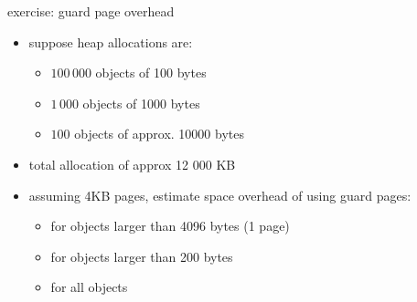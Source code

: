 \begin{frame}{exercise: guard page overhead}
    \begin{itemize}
    \item suppose heap allocations are:
        \begin{itemize}
        \item $100\,000$ objects of 100 bytes
        \item $1\,000$ objects of 1000 bytes
        \item $100$ objects of approx. 10000 bytes
        \end{itemize}
    \item total allocation of approx 12 000 KB
    \item assuming 4KB pages, estimate space overhead of using guard pages:
        \begin{itemize}
        \item for objects larger than 4096 bytes (1 page)
        \item for objects larger than 200 bytes
        \item for all objects
        \end{itemize}
    \end{itemize}
\end{frame}
